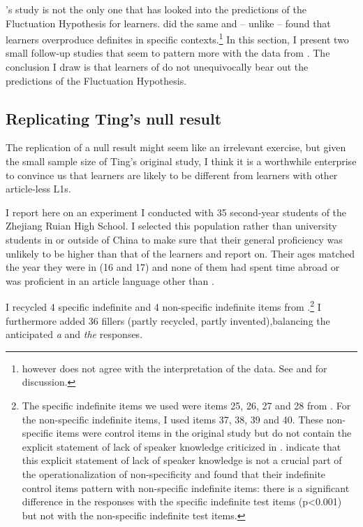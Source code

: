 \documentclass[output=paper,
modfonts
]{langscibook}
\begin{document}
\citeauthor{SnapeLeungTing2006}’s study is not the only one that has looked into the predictions of the Fluctuation Hypothesis for  learners. \citet{Trenkic2008} did the same and – unlike \citeauthor{SnapeLeungTing2006} – found that  learners overproduce definites in  specific contexts.\footnote{\citet{Trenkic2008} however does not agree with the interpretation of the data. See \citet{Trenkic2008} and \citet{IoninZubizarretaPhilippov2009} for discussion.}  In this section, I present two small follow-up studies that seem to pattern more with the data from \citet{SnapeLeungTing2006}. The conclusion I draw is that  learners of  do not unequivocally bear out the predictions of the Fluctuation Hypothesis.

\subsection{Replicating Ting's null result}\label{sec:lebruyn:4-1}

The replication of a null result might seem like an irrelevant exercise, but given the small sample size of Ting’s original study, I think it is a worthwhile enterprise to convince us that  learners are likely to be different from learners with other article-less L1s.

I report here on an experiment I conducted with 35 second-year students of the Zhejiang Ruian High School. I selected this population rather than university students in or outside of China to make sure that their general proficiency was unlikely to be higher than that of the  learners \citet{Hawkinsetal2006} and \citet{Reidetal2006} report on. Their ages matched the year they were in (16 and 17) and none of them had spent time abroad or was proficient in an article language other than .

I recycled 4 specific indefinite and 4 non-specific indefinite items from \citet{IoninKoWexler2004}.\footnote{The specific indefinite items we used were items 25, 26, 27 and 28 from \citet{IoninKoWexler2004}. For the non-specific indefinite items, I used items 37, 38, 39 and 40. These non-specific items were control items in the original study but do not contain the explicit statement of lack of speaker knowledge criticized in \citet{Trenkic2008}. \citet{IoninZubizarretaPhilippov2009} indicate that this explicit statement of lack of speaker knowledge is not a crucial part of the operationalization of non-specificity and \citet{IoninKoWexler2004} found that their indefinite control items pattern with non-specific indefinite items: there is a significant difference in the responses with the specific indefinite test items (p<0.001) but not with the non-specific indefinite test items.} I furthermore added 36 fillers (partly recycled, partly invented),\largerpage balancing the anticipated \textit{a} and \textit{the} responses.
\end{document}
